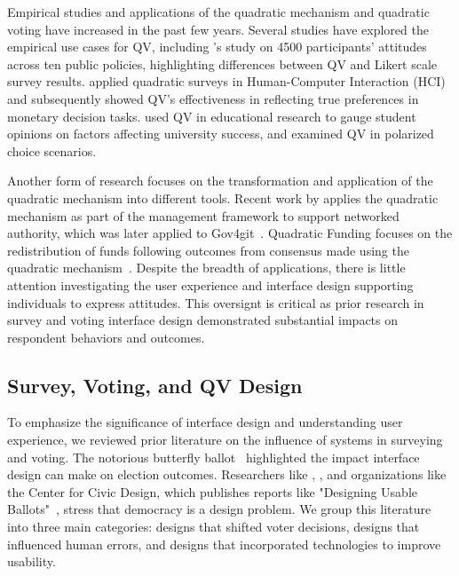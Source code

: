Empirical studies and applications of the quadratic mechanism and quadratic voting have increased in the past few years. Several studies have explored the empirical use cases for QV, including \textcite{quarfoot2017quadratic}'s study on 4500 participants' attitudes across ten public policies, highlighting differences between QV and Likert scale survey results. \textcite{chengCanShowWhat2021} applied quadratic surveys in Human-Computer Interaction (HCI) and subsequently showed QV's effectiveness in reflecting true preferences in monetary decision tasks. \textcite{naylor2017first} used QV in educational research to gauge student opinions on factors affecting university success, and \textcite{cavailleWhoCaresMeasuring} examined QV in polarized choice scenarios.

Another form of research focuses on the transformation and application of the quadratic mechanism into different tools. Recent work by \textcite{southPluralManagement2024} applies the quadratic mechanism as part of the management framework to support networked authority, which was later applied to Gov4git~\cite{Gov4gitDecentralizedPlatform2023}. Quadratic Funding focuses on the redistribution of funds following outcomes from consensus made using the quadratic mechanism~\cite{buterinFlexibleDesignFunding2019a, freitasQuadraticFundingIncomplete2024}. Despite the breadth of applications, there is little attention investigating the user experience and interface design supporting individuals to express attitudes. This oversignt is critical as prior research in survey and voting interface design demonstrated substantial impacts on respondent behaviors and outcomes.

\subsection{Survey, Voting, and QV Design}
To emphasize the significance of interface design and understanding user experience, we reviewed prior literature on the influence of systems in surveying and voting. The notorious butterfly ballot~\cite{wandButterflyDidIt2001} highlighted the impact interface design can make on election outcomes. Researchers like \textcite{engstrom2020politics}, \textcite{chisnellDemocracyDesignProblem2016}, and organizations like the Center for Civic Design, which publishes reports like "Designing Usable Ballots"~\cite{DesigningUsableBallots2015}, stress that democracy is a design problem. We group this literature into three main categories: designs that shifted voter decisions, designs that influenced human errors, and designs that incorporated technologies to improve usability.
